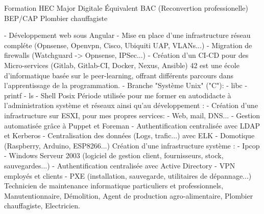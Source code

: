 \documentclass[
	a4paper,
]{FortySecondsCV/fortysecondscv}
\begin{document}
\makefrontsidebar

\begin{cvtable}[1.5]
		{Formation HEC Major Digitale}
		{Équivalent BAC (Reconvertion professionelle)}
		{BEP/CAP Plombier chauffagiste}
\end{cvtable}

\begin{cvtable}[3]
		{
			\tabto{2mm}- Développement web sous Angular
			\tabto{2mm}- Mise en place  d'une infrastructure réseau compléte (Opnsense, Openvpn, Cisco, Ubiquiti UAP, VLANs...)
			\tabto{2mm}- Migration de firewalls (Watchguard -> Opnsense, IPSec...)
			\tabto{2mm}- Création d'un CI-CD pour des Micro-services (Gitlab, Gitlab-CI, Docker, Nexus, Ansible)
		}
	{
	42 est une école d'informatique basée sur le peer-learning, offrant différents parcours dans l'apprentissage de la programmation.
		\tabto{2mm}- Branche "Système Unix" ("C"):
   			\tabto{4mm}- libc
			\tabto{4mm}- printf
     		\tabto{4mm}- ls
     		\tabto{4mm}- Shell Posix
	}
	{
		Période utilisée pour me former en autodidacte à l'administration système et réseaux ainsi qu'au développement :
		\tabto{2mm}- Création d'une infrastructure sur ESXI, pour mes propres services:
			\tabto{4mm}- Web, mail, DNS...
			\tabto{4mm}- Gestion automatisée grâce à Puppet et Foreman
			\tabto{4mm}- Authentification centralisée avec LDAP et Kerberos
			\tabto{4mm}- Centralisation des données (Logs, trafic...) avec ELK
		\tabto{2mm}- Domotique (Raspberry, Arduino, ESP8266...)
	}
	{
		Création d'une infrastructure système :
			\tabto{2mm}- Ipcop
			\tabto{2mm}- Windows Serveur 2003 (logiciel de gestion client, fournisseurs, stock, sauvegardes...)
			\tabto{2mm}- Authentification centralisée avec Active Directory
			\tabto{2mm}- VPN employés et clients
			\tabto{2mm}- PXE (installation, sauvegarde, utilitaires de dépannage...)
	}
	{
		Technicien de maintenance informatique particuliers et professionnels, Manutentionnaire, Démolition, Agent de production agro-alimentaire, Plombier chauffagiste, Electricien.
	}
	{ }
\end{cvtable}
\end{document}
